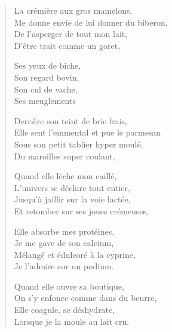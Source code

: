 \begin{verse}
La crémière aux gros mamelons,\\
Me donne envie de lui donner du biberon, \\
De l’asperger de tout mon lait, \\
D’être trait comme un goret,

Ses yeux de biche,\\
Son regard bovin, \\
Son cul de vache, \\
Ses meuglements

Derrière son teint de brie frais, \\
Elle sent l’emmental et pue le parmesan \\
Sous son petit tablier hyper moulé, \\
Du maroilles super coulant, 

Quand elle lèche mon  caillé, \\
L’univers se déchire tout entier, \\
Jusqu’à jaillir sur la voie lactée, \\
Et retomber sur ses joues crémeuses,

Elle absorbe mes protéines, \\
Je me gave de son calcium,\\
Mélangé et édulcoré à la cyprine, \\
Je l’admire sur un podium.

Quand elle ouvre sa boutique,\\
On s’y enfonce comme dans du beurre, \\
Elle coagule, se déshydrate, \\
Lorsque je la moule au lait cru.
\end{verse}

